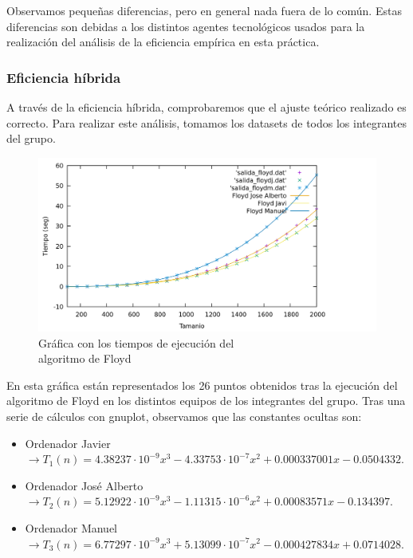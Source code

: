 \documentclass[10pt,a4paper]{article}
\begin{document}
Observamos pequeñas diferencias, pero en general nada fuera de lo común. Estas diferencias son debidas a los distintos agentes tecnológicos usados para la realización del análisis de la eficiencia empírica en esta práctica.

\subsubsection{Eficiencia híbrida}

A través de la eficiencia híbrida, comprobaremos que el ajuste teórico realizado es correcto. Para realizar este análisis, tomamos los datasets de todos los integrantes del grupo. \\

\begin{figure}[h!]
\centering
\includegraphics[scale=0.15]{../../Images/floyd_combinados.png}
\caption{Gráfica con los tiempos de ejecución del \\algoritmo de Floyd}
\end{figure}

En esta gráfica están representados los 26 puntos obtenidos tras la ejecución del algoritmo de Floyd en los distintos equipos de los integrantes del grupo. Tras una serie de cálculos con gnuplot, observamos que las constantes ocultas son:
\begin{itemize}
	\item Ordenador Javier \(\rightarrow T_1(n) = 4.38237 \cdot 10^{-9} x^3 -4.33753 \cdot 10^{-7} x^2 + 0.000337001 x -0.0504332\).
	\item Ordenador José Alberto \(\rightarrow T_2(n) = 5.12922 \cdot 10^{-9} x^3 -1.11315 \cdot 10^{-6} x^2 + 0.00083571 x - 0.134397\).
	\item Ordenador Manuel \(\rightarrow T_3(n) = 6.77297 \cdot 10^{-9} x^3 + 5.13099 \cdot 10^{-7} x^2 - 0.000427834 x + 0.0714028\).
\end{itemize} 
\end{document}
